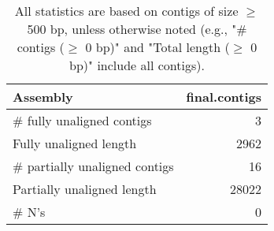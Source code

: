 \documentclass[12pt,a4paper]{article}
\begin{document}
\begin{table}[ht]
\begin{center}
\caption{All statistics are based on contigs of size $\geq$ 500 bp, unless otherwise noted (e.g., "\# contigs ($\geq$ 0 bp)" and "Total length ($\geq$ 0 bp)" include all contigs).}
\begin{tabular}{|l*{1}{|r}|}
\hline
Assembly & final.contigs \\ \hline
\# fully unaligned contigs & 3 \\ \hline
Fully unaligned length & 2962 \\ \hline
\# partially unaligned contigs & 16 \\ \hline
Partially unaligned length & 28022 \\ \hline
\# N's & 0 \\ \hline
\end{tabular}
\end{center}
\end{table}
\end{document}
